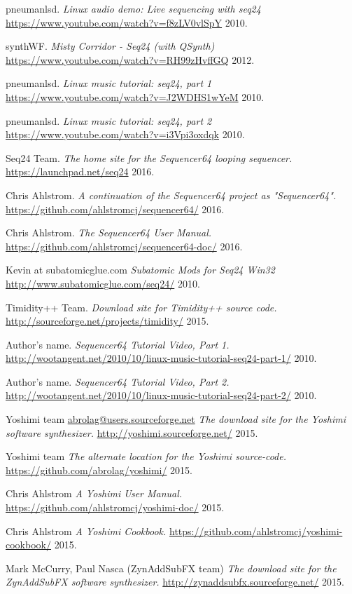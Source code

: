 \begin{thebibliography}{99}
   pneumanlsd.
   \emph{Linux audio demo: Live sequencing with seq24}
   \url{https://www.youtube.com/watch?v=f8zLV0vlSpY}
   2010.

   synthWF.
   \emph{Misty Corridor - Seq24 (with QSynth)}
   \url{https://www.youtube.com/watch?v=RH99zHvffGQ}
   2012.

   pneumanlsd.
   \emph{Linux music tutorial: seq24, part 1}
   \url{https://www.youtube.com/watch?v=J2WDHS1wYeM}
   2010.
   
   pneumanlsd.
   \emph{Linux music tutorial: seq24, part 2}
   \url{https://www.youtube.com/watch?v=i3Vpi3oxdqk}
   2010.

   Seq24 Team.
   \emph{The home site for the Sequencer64 looping sequencer.}
   \url{https://launchpad.net/seq24}
   2016.

   Chris Ahlstrom.
   \emph{A continuation of the Sequencer64 project as "Sequencer64".}
   \url{https://github.com/ahlstromcj/sequencer64/}
   2016.

   Chris Ahlstrom.
   \emph{The Sequencer64 User Manual.}
   \url{https://github.com/ahlstromcj/sequencer64-doc/}
   2016.

   Kevin at subatomicglue.com
   \emph{Subatomic Mods for Seq24 Win32}
   \url{http://www.subatomicglue.com/seq24/}
   2010.

   Timidity++ Team.
   \emph{Download site for Timidity++ source code.}
   \url{http://sourceforge.net/projects/timidity/}
   2015.

   Author's name.
   \emph{Sequencer64 Tutorial Video, Part 1.}
   \url{http://wootangent.net/2010/10/linux-music-tutorial-seq24-part-1/}
   2010.

   Author's name.
   \emph{Sequencer64 Tutorial Video, Part 2.}
   \url{http://wootangent.net/2010/10/linux-music-tutorial-seq24-part-2/}
   2010.

   Yoshimi team \url{abrolag@users.sourceforge.net}
   \emph{The download site for the Yoshimi software synthesizer.}
   \url{http://yoshimi.sourceforge.net/}
   2015.

   Yoshimi team
   \emph{The alternate location for the Yoshimi source-code.}
   \url{https://github.com/abrolag/yoshimi/}
   2015.

   Chris Ahlstrom
   \emph{A Yoshimi User Manual.}
   \url{https://github.com/ahlstromcj/yoshimi-doc/}
   2015.

   Chris Ahlstrom
   \emph{A Yoshimi Cookbook.}
   \url{https://github.com/ahlstromcj/yoshimi-cookbook/}
   2015.

   Mark McCurry, Paul Nasca (ZynAddSubFX team)
   \emph{The download site for the ZynAddSubFX software synthesizer.}
   \url{http://zynaddsubfx.sourceforge.net/}
   2015.

\end{thebibliography}

